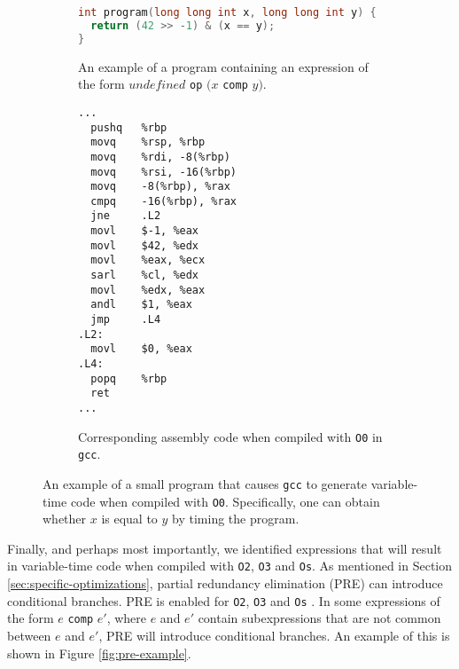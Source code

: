 \begin{figure}[H]
  \centering
     \begin{subfigure}[b]{0.41\textwidth}
        \begin{lstlisting}[style=defstyle,language={C},basicstyle=\ttfamily,breaklines=true]
int program(long long int x, long long int y) { 
  return (42 >> -1) & (x == y); 
}\end{lstlisting} 
      \vspace{10em}
      \caption{An example of a program containing an expression of the form $undefined$ \texttt{op} $(x$ \texttt{comp} $y)$.}
    \end{subfigure}
    \hspace{1cm}
    \begin{subfigure}[b]{0.35\textwidth}
      \begin{lstlisting}[style=defstyle,language={[x86masm]Assembler},basicstyle=\ttfamily,breaklines=true]
...
  pushq   %rbp
  movq    %rsp, %rbp
  movq    %rdi, -8(%rbp)
  movq    %rsi, -16(%rbp)
  movq    -8(%rbp), %rax
  cmpq    -16(%rbp), %rax
  jne     .L2
  movl    $-1, %eax
  movl    $42, %edx
  movl    %eax, %ecx
  sarl    %cl, %edx
  movl    %edx, %eax
  andl    $1, %eax
  jmp     .L4
.L2:
  movl    $0, %eax
.L4:
  popq    %rbp
  ret
...\end{lstlisting} 
       \caption{Corresponding assembly code when compiled with \texttt{O0} in \texttt{gcc}.}
  \end{subfigure}
  \caption{An example of a small program that causes \texttt{gcc} to generate variable-time code when compiled with \texttt{O0}. Specifically, one can obtain whether $x$ is equal to $y$ by timing the program.}
  \label{fig:vulnerable-expression}
\end{figure}

Finally, and perhaps most importantly, we identified expressions that will result in variable-time code when compiled with \texttt{O2}, \texttt{O3} and \texttt{Os}.
As mentioned in Section \ref{sec:specific-optimizations}, partial redundancy elimination (PRE) can introduce conditional branches.
PRE is enabled for \texttt{O2}, \texttt{O3} and \texttt{Os} \citep{gcc-manual}.
In some expressions of the form $e$ \texttt{comp} $e'$, where $e$ and $e'$ contain subexpressions that are not common between $e$ and $e'$, PRE will introduce conditional branches. An example of this is shown in Figure \ref{fig:pre-example}.

